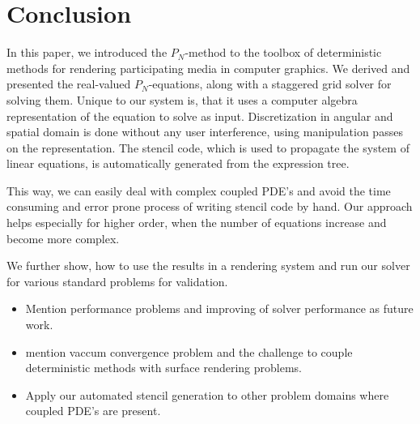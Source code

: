 \section{Conclusion}
\label{sec:conclusion}

In this paper, we introduced the $P_N$-method to the toolbox of deterministic methods for rendering participating media in computer graphics. We derived and presented the real-valued $P_N$-equations, along with a staggered grid solver for solving them. Unique to our system is, that it uses a computer algebra representation of the equation to solve as input. Discretization in angular and spatial domain is done without any user interference, using manipulation passes on the representation. The stencil code, which is used to propagate the system of linear equations, is automatically generated from the expression tree.

This way, we can easily deal with complex coupled PDE's and avoid the time consuming and error prone process of writing stencil code by hand. Our approach helps especially for higher order, when the number of equations increase and become more complex.

We further show, how to use the results in a rendering system and run our solver for various standard problems for validation. 

\begin{itemize}
	\item Mention performance problems and improving of solver performance as future work.
	\item mention vaccum convergence problem and the challenge to couple deterministic methods with surface rendering problems.
	\item Apply our automated stencil generation to other problem domains where coupled PDE's are present.
\end{itemize}

